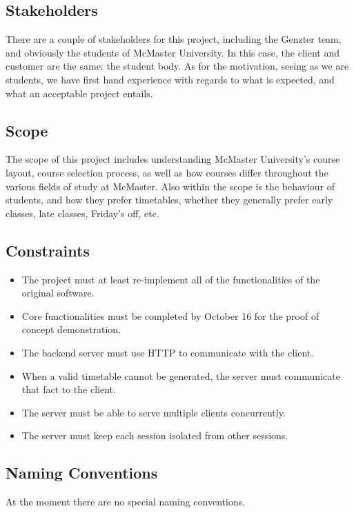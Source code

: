 \documentclass[12pt]{article}
\begin{document}
\subsection{Stakeholders}
There are a couple of stakeholders for this project, including the Genzter team, and obviously the students of McMaster University. In this case, the client and customer are the same: the student body. As for the motivation, seeing as we are students, we have first hand experience with regards to what is expected, and what an acceptable project entails.

\subsection{Scope}
The scope of this project includes understanding McMaster University's course layout, course selection process, as well as how courses differ throughout the various fields of study at McMaster. Also within the scope is the behaviour of students, and how they prefer timetables, whether they generally prefer early classes, late classes, Friday's off, etc. 

\subsection{Constraints}
\begin{itemize}
  \item The project must at least re-implement all of the functionalities of the original software.
  \item Core functionalities must be completed by October 16 for the proof of concept demonstration.
  \item The backend server must use HTTP to communicate with the client.
  \item When a valid timetable cannot be generated, the server must communicate that fact to the client.
  \item The server must be able to serve multiple clients concurrently.
  \item The server must keep each session isolated from other sessions.
\end{itemize}

\subsection{Naming Conventions}
At the moment there are no special naming conventions.
\end{document}
